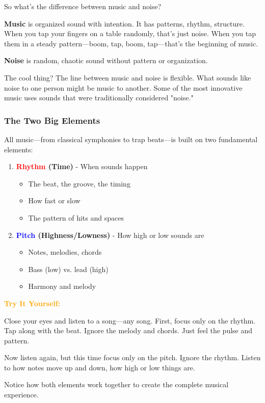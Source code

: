 \documentclass[11pt,letterpaper]{article}
\newcommand{\bluepurple}[1]{\textcolor{blue}{\textbf{#1}}}
\newcommand{\redtext}[1]{\textcolor{red}{\textbf{#1}}}
\newcommand{\orangetext}[1]{\textcolor{orange}{\textbf{#1}}}
\begin{document}
So what's the difference between music and noise?

\textbf{Music} is organized sound with intention. It has patterns, rhythm, structure. When you tap your fingers on a table randomly, that's just noise. When you tap them in a steady pattern—boom, tap, boom, tap—that's the beginning of music.

\textbf{Noise} is random, chaotic sound without pattern or organization.

The cool thing? The line between music and noise is flexible. What sounds like noise to one person might be music to another. Some of the most innovative music uses sounds that were traditionally considered "noise."

\subsubsection{The Two Big Elements}

All music—from classical symphonies to trap beats—is built on two fundamental elements:

\begin{enumerate}[leftmargin=*]
\item \textbf{\redtext{Rhythm} (Time)} - When sounds happen
\begin{itemize}
\item The beat, the groove, the timing
\item How fast or slow
\item The pattern of hits and spaces
\end{itemize}

\item \textbf{\bluepurple{Pitch} (Highness/Lowness)} - How high or low sounds are
\begin{itemize}
\item Notes, melodies, chords
\item Bass (low) vs. lead (high)
\item Harmony and melody
\end{itemize}
\end{enumerate}

\begin{tcolorbox}[colback=orange!10,colframe=orange,width=\textwidth,arc=3mm,boxrule=1pt]
\textbf{\orangetext{Try It Yourself:}}

Close your eyes and listen to a song—any song. First, focus only on the rhythm. Tap along with the beat. Ignore the melody and chords. Just feel the pulse and pattern.

Now listen again, but this time focus only on the pitch. Ignore the rhythm. Listen to how notes move up and down, how high or low things are.

Notice how both elements work together to create the complete musical experience.
\end{tcolorbox}
\end{document}
